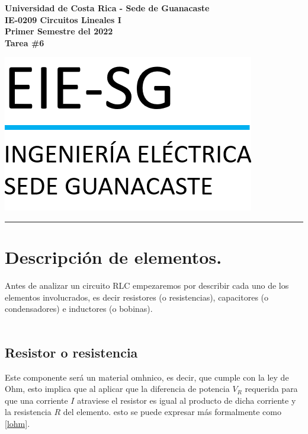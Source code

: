 \documentclass[letterpaper,12pt]{article} %
\begin{document}
\noindent
\begin{minipage}{0.7\textwidth}
	\textbf{Universidad de Costa Rica - Sede de Guanacaste} \\
	\textbf{IE-0209 Circuitos Lineales I} \\
	\textbf{Primer Semestre del 2022} \\
	\textbf{Tarea \#6}
\end{minipage}
\noindent
\begin{minipage}{0.3\textwidth}
	\centering
	\includegraphics[scale=0.65]{LogoEIE-SG.png}
\end{minipage}
\vspace{0.4cm}
\hrule
\vspace{0.4cm}
\section*{Descripción de elementos.}

Antes de analizar un circuito RLC empezaremos por describir cada uno de los elementos involucrados, es decir resistores (o resistencias), capacitores (o condensadores) e inductores (o bobinas). \\ \\

\subsection*{Resistor o resistencia}
Este componente será un material omhnico, es decir, que cumple con la ley de Ohm, esto implica que al aplicar que la diferencia de potencia $V_R$ requerida para que una corriente $I$ atraviese el resistor es igual al producto de dicha corriente y la resistencia $R$ del elemento. esto se puede expresar más formalmente como \eqref{lohm}.\\ 
\end{document}
